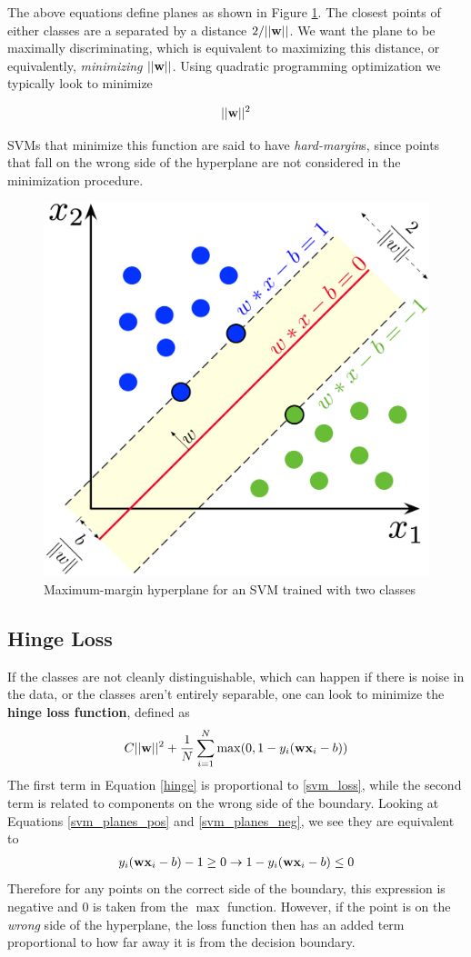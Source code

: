 The above equations define planes as shown in Figure \ref{fig:svm}. The closest points of either classes are a separated by a distance $2/ ||\textbf{w}||$. We want the plane to be maximally discriminating, which is equivalent to maximizing this distance, or equivalently, \emph{minimizing} $||\textbf{w}||$. Using quadratic programming optimization we typically look to minimize \cite{burkov}


\begin{align}\label{svm_loss}
||\textbf{w}||^2
\end{align}

SVMs that minimize this function are said to have \emph{hard-margin}s, since points that fall on the wrong side of the hyperplane are not considered in the minimization procedure. 

\begin{figure}
\centerline{\includegraphics[width=0.5\linewidth]{mathematics/fig/svm.png}}
\caption{Maximum-margin hyperplane for an SVM trained with two classes \cite{wiki_svm}}
\label{fig:svm}
\end{figure}

\subsection{Hinge Loss}

If the classes are not cleanly distinguishable, which can happen if there is noise in the data, or the classes aren't entirely separable, one can look to minimize the \textbf{hinge loss function}, defined as
\begin{align}\label{hinge}
	C||\textbf{w}||^2 + \frac{1}{N}\sum_{i=1}^N \max(0,1-y_i(\textbf{wx}_i-b))
\end{align}
The first term in Equation \ref{hinge} is proportional to \ref{svm_loss}, while the second term is related to components on the wrong side of the boundary. Looking at Equations \ref{svm_planes_pos} and \ref{svm_planes_neg}, we see they are equivalent to 
\begin{align}
	y_i(\textbf{wx}_i-b) -1\ge 0\rightarrow 1- y_i(\textbf{wx}_i-b) \le 0
\end{align}
Therefore for any points on the correct side of the boundary, this expression is negative and $0$ is taken from the $\max$ function. However, if the point is on the \emph{wrong} side of the hyperplane, the loss function then has an added term proportional to how far away it is from the decision boundary.

